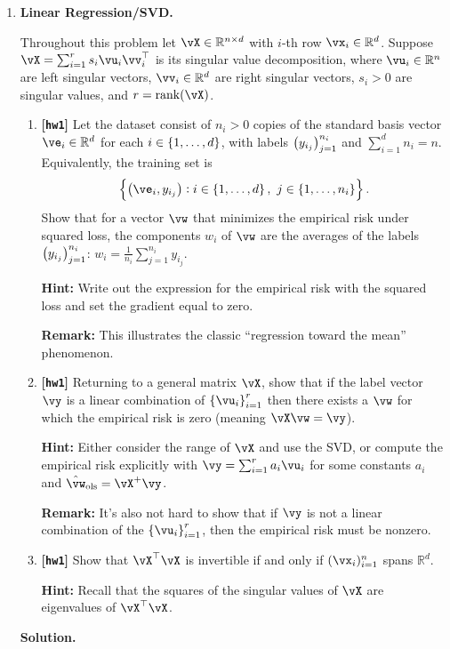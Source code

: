 \documentclass{article}
\DeclareMathOperator{\rank}{rank}
\def\R{\mathbb{R}}
\def\hw{\textbf{[\texttt{hw1}]}\xspace}
\theoremstyle{definition}
\theoremstyle{remark}
\newenvironment{Q}
{%
  \clearpage
  \item
  }
  {%
    \phantom{s} %
    \bigskip
    \textbf{Solution.}
  }
\begin{document}
  \begin{enumerate}[font={\Large\bfseries},left=0pt]
    \begin{Q}
  \textbf{\Large Linear Regression/SVD.}

  Throughout this problem let $\vX\in\R^{n\times d}$ with $i$-th row $\vx_i\in\R^d$.
  Suppose $\vX = \sum_{i = 1}^r s_i \vu_i \vv_i^\top$ is its singular value decomposition,
  where $\vu_i\in\R^n$ are left singular vectors, $\vv_i\in\R^d$ are right singular vectors,
  $s_i>0$ are singular values, and $r = \rank(\vX)$.
  \begin{enumerate}
    \item \hw Let the dataset consist of $n_i>0$ copies of the standard basis vector $\ve_i\in\R^d$ for each $i\in\cbr{1,\ldots,d}$,
      with labels $\del{y_{i_j}}_{j = 1}^{n_i}$ and $\sum_{i = 1}^d n_i = n$.
      Equivalently, the training set is
      \[
        \cbr{\del{\ve_i, y_{i_j}} : i\in\cbr{1,\ldots,d},\ j\in\cbr{1,\ldots,n_i}}.
      \]
    Show that for a vector $\vw$ that minimizes the empirical risk under squared loss,
    the components $w_i$ of $\vw$ are the averages of the labels $\del{y_{i_j}}_{j = 1}^{n_i}$: $w_i = \frac{1}{n_i}\sum_{j = 1}^{n_i} y_{i_j}$.
    
    \textbf{Hint:} Write out the expression for the empirical risk with the squared loss and set the gradient equal to zero.
    
    \textbf{Remark:} This illustrates the classic ``regression toward the mean'' phenomenon.
    
    \item \hw Returning to a general matrix $\vX$, show that if the label vector $\vy$ is a linear combination of $\cbr{\vu_i}_{i = 1}^r$ then there exists a $\vw$ for which the empirical risk is zero (meaning $\vX \vw = \vy$).
    
    \textbf{Hint:} Either consider the range of $\vX$ and use the SVD, or compute the empirical risk explicitly with $\vy = \sum_{i = 1}^r a_i \vu_i$ for some constants $a_i$ and $\hat{\vw}_{\textrm{ols}} = \vX^+ \vy$.
    
    \textbf{Remark:} It's also not hard to show that if $\vy$ is not a linear combination of the $\cbr{\vu_i}_{i = 1}^r$, then the empirical risk must be nonzero.
    
    \item \hw Show that $\vX^\top \vX$ is invertible if and only if $(\vx_i)_{i = 1}^n$ spans $\mathbb{R}^d$.
    
    \textbf{Hint:} Recall that the squares of the singular values of $\vX$ are eigenvalues of $\vX^\top \vX$.


\end{enumerate}
\end{Q}
\end{enumerate}
\end{document}
